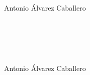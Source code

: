 \chapter*{}


% 



\thispagestyle{empty}

\begin{center}
{\large\bfseries \myTitle}\\
\end{center}
\begin{center}
Antonio Álvarez Caballero \\
\end{center}

\\

\vspace{0.7cm}
\\


\cleardoublepage


\thispagestyle{empty}


\begin{center}
{\large\bfseries \myTitleEng}\\
\end{center}
\begin{center}
Antonio Álvarez Caballero \\
\end{center}


\begin{otherlanguage}{british}
\\

\vspace{0.7cm}
\\



\end{otherlanguage}

\chapter*{}
\thispagestyle{empty}

